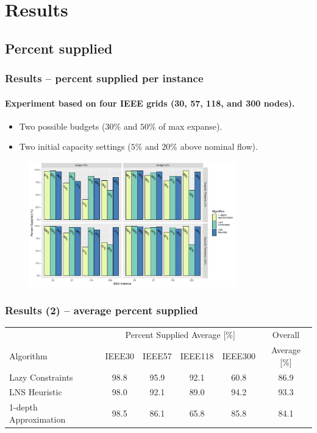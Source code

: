 \documentclass{beamer}
\begin{document}
\section{Results}
\subsection{Percent supplied}
\begin{frame}
\frametitle{Results -- percent supplied per instance}
\framesubtitle{Experiment based on four IEEE grids (30, 57, 118, and 300 nodes).}
\tiny
\begin{itemize}
	\item Two possible budgets ($30\%$ and $50\%$ of max expanse).
	\item Two initial capacity settings ($5\%$ and $20\%$ above nominal flow).
\end{itemize}
\begin{figure}
\centering
\includegraphics[width=0.8\textwidth]{Aux_files/12hour_instance_results.pdf}
\end{figure}
\end{frame}
\begin{frame}
\frametitle{Results (2) -- average percent supplied}
\begin{table}%
\center
\scriptsize
\begin{tabular}{lccccc}
 & \multicolumn{4}{c}{Percent Supplied Average [\%]} & Overall\\
Algorithm & IEEE30 & IEEE57 & IEEE118 & IEEE300 & Average [\%]\\ \toprule
Lazy Constraints & 98.8 & 95.9 & 92.1 & 60.8 & 86.9\\ \midrule
LNS Heuristic & 98.0 & 92.1 & 89.0 & 94.2 & 93.3\\ \midrule
1-depth Approximation & 98.5 & 86.1 & 65.8 & 85.8 & 84.1 \\ \bottomrule
\end{tabular}
\end{table}
\end{frame}
\end{document}
